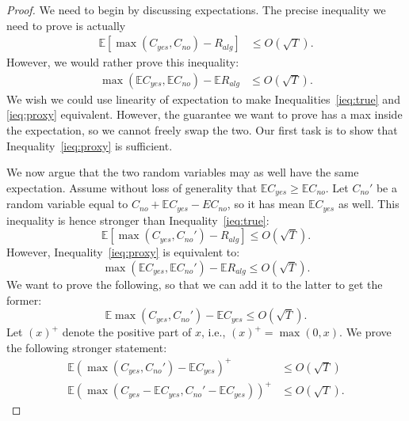 \documentclass[final,12pt]{colt2018}
\newcommand{\E}{\mathbb{E}}
\newcommand{\RewardAlg}{R_{alg}}
\newcommand{\CostYes}{C_{yes}}
\newcommand{\CostNo}{C_{no}}
\begin{document}
\begin{proof}
  We need to begin by discussing expectations. The precise inequality we need to
  prove is actually
  \begin{align}
    \E \left[ \max \left( \CostYes, \CostNo \right) - \RewardAlg \right] &\le O(\sqrt{T}). \label{ieq:true}
  \end{align}
  However, we would rather prove this inequality:
  \begin{align}
    \max \left( \E \CostYes, \E \CostNo \right) - \E \RewardAlg &\le O(\sqrt{T}). \label{ieq:proxy}
  \end{align}
  We wish we could use linearity of expectation to make Inequalities~\ref{ieq:true} and
  \ref{ieq:proxy} equivalent. However, the guarantee we want to prove has a max
  inside the expectation, so we cannot freely swap the two. Our first task is
  to show that Inequality~\ref{ieq:proxy} is sufficient.
  
  We now argue that the two random variables may as well have the same
  expectation. Assume without loss of generality that
  $\E \CostYes \ge \E \CostNo$. Let $\CostNo'$ be a random variable equal to
  $\CostNo + \E \CostYes - E \CostNo$, so it has mean $\E \CostYes$ as well.
  This inequality is hence stronger than Inequality~\ref{ieq:true}:
  \[
    \E \left[ \max \left( \CostYes, \CostNo' \right) - \RewardAlg \right] \le O(\sqrt{T}).
  \]
  However, Inequality~\ref{ieq:proxy} is equivalent to:
  \[
    \max \left( \E \CostYes, \E \CostNo' \right) - \E \RewardAlg \le O(\sqrt{T}).
  \]
  We want to prove the following, so that we can add it to the latter to get the
  former:
  \[
    \E \max \left( \CostYes, \CostNo' \right) - \E \CostYes \le O(\sqrt{T}).
  \]
  Let $(x)^+$ denote the positive part of $x$, i.e., $(x)^+ = \max(0, x)$.  We
  prove the following stronger statement:
  \begin{align}
    \E \left( \max \left( \CostYes, \CostNo' \right) - \E \CostYes \right)^+ &\le O(\sqrt{T}) \nonumber \\
    \E \left( \max \left( \CostYes - \E\CostYes, \CostNo' -\E \CostYes\right) \right)^+ &\le O(\sqrt{T}). \label{ieq:newgoal}
  \end{align}
  

\end{proof}
\end{document}
